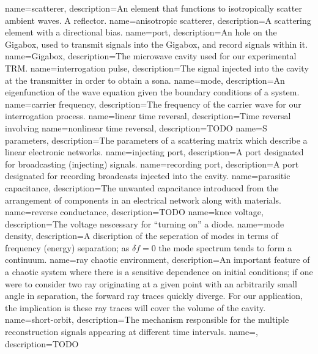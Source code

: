 {
   name=scatterer,
  description={An element that functions to isotropically scatter ambient waves. A reflector.}
}
{
   name=anisotropic scatterer,
  description={A scattering element with a directional bias.}
}
{
   name=port,
  description={An hole on the Gigabox, used to transmit signals into the Gigabox, and record signals within it.}
}
{
   name=Gigabox,
  description={The microwave cavity used for our experimental TRM.}
}
{
   name=interrogation pulse,
  description={The signal injected into the cavity at the transmitter in order to obtain a sona.}
}
{
   name=mode,
  description={An eigenfunction of the wave equation given the boundary conditions of a system.}
}
{
   name=carrier frequency,
  description={The frequency of the carrier wave for our interrogation process.}
}
{
   name=linear time reversal,
  description={Time reversal involving}
}
{
   name=nonlinear time reversal,
  description={TODO}
}
{
   name=S parameters,
  description={The parameters of a scattering matrix which describe a linear electronic networks.}
}
{
   name=injecting port,
  description={A port designated for broadcasting (injecting) signals.}
}
{
   name=recording port,
  description={A port designated for recording broadcasts injected into the cavity.}
}
{
   name=parasitic capacitance,
  description={The unwanted capacitance introduced from the arrangement of components in an electrical network along with materials.}
}
{
   name=reverse conductance,
  description={TODO}
}
{
   name=knee voltage,
  description={The voltage nescessary for ``turning on'' a diode.}
}
{
   name=mode density,
  description={A discription of the seperation of modes in terms of frequency (energy) separation; as $\delta f = 0$ the mode spectrum tends to form a continuum.}
}
{
   name=ray chaotic environment,
  description={An important feature of a chaotic system where there is a sensitive dependence on initial conditions; if one were to consider two ray originating at a given point with an arbitrarily small angle in separation, the forward ray traces quickly diverge. For our application, the implication is these ray traces will cover the volume of the cavity.}
}
{
   name=short-orbit,
  description={The mechanism responsible for the multiple reconstruction signals appearing at different time intervals. }
}
\newglossaryentry{}
{
   name=,
  description={TODO}
}

